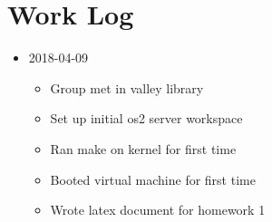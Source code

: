 \section{Work Log}
\begin{itemize}
\item 2018-04-09
	\begin{itemize}
	\item Group met in valley library
    \item Set up initial os2 server workspace
    \item Ran make on kernel for first time
    \item Booted virtual machine for first time
    \item Wrote latex document for homework 1
	\end{itemize}
\end{itemize}